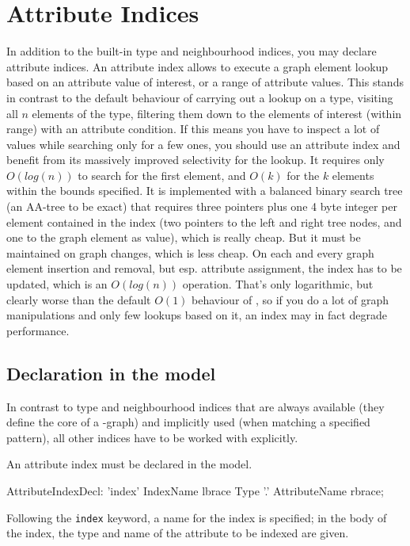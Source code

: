 \section{Attribute Indices}\label{sec:attributeindices}
In addition to the built-in type and neighbourhood indices, you may declare attribute indices.
An attribute index allows to execute a graph element lookup based on an attribute value of interest, or a range of attribute values.
This stands in contrast to the default behaviour of carrying out a lookup on a type, visiting all $n$ elements of the type, filtering them down to the elements of interest (within range) with an attribute condition.
If this means you have to inspect a lot of values while searching only for a few ones, you should use an attribute index and benefit from its massively improved selectivity for the lookup.
It requires only $O(log(n))$ to search for the first element, and $O(k)$ for the $k$ elements within the bounds specified.
It is implemented with a balanced binary search tree (an AA-tree\cite{Andersson93balancedsearch} to be exact) that requires three pointers plus one 4 byte integer per element contained in the index (two pointers to the left and right tree nodes, and one to the graph element as value), which is really cheap.
But it must be maintained on graph changes, which is less cheap.
On each and every graph element insertion and removal, but esp. attribute assignment, the index has to be updated, which is an $O(log(n))$ operation.
That's only logarithmic, but clearly worse than the default $O(1)$ behaviour of \GrG{}, so if you do a lot of graph manipulations and only few lookups based on it, an index may in fact degrade performance.

\subsection*{Declaration in the model}
In contrast to type and neighbourhood indices that are always available (they define the core of a \GrG{}-graph) and implicitly used (when matching a specified pattern), all other indices have to be worked with explicitly.

An attribute index must be declared in the model.

\begin{rail}
  AttributeIndexDecl: 'index' IndexName lbrace Type '.' AttributeName rbrace;
\end{rail}

Following the \texttt{index} keyword, a name for the index is specified; in the body of the index, the type and name of the attribute to be indexed are given.

